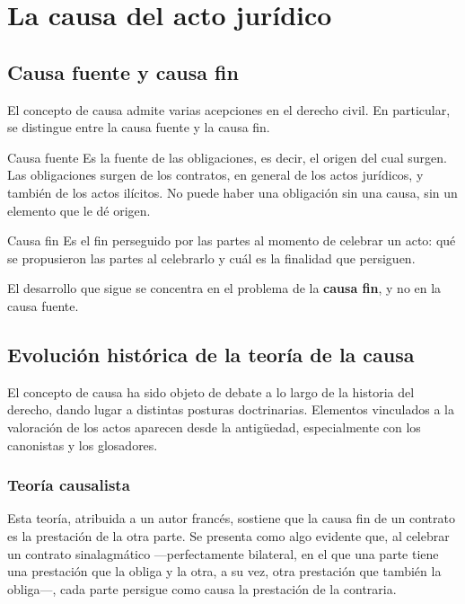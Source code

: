 \documentclass[12pt,oneside]{book}
\begin{document}
\chapter{La causa del acto jurídico}

\section{Causa fuente y causa fin}

El concepto de causa admite varias acepciones en el derecho civil. En particular, se distingue entre la causa fuente y la causa fin.

\begin{definition}{Causa fuente}
Es la fuente de las obligaciones, es decir, el origen del cual surgen. Las obligaciones surgen de los contratos, en general de los actos jurídicos, y también de los actos ilícitos. No puede haber una obligación sin una causa, sin un elemento que le dé origen.
\end{definition}

\begin{definition}{Causa fin}
Es el fin perseguido por las partes al momento de celebrar un acto: qué se propusieron las partes al celebrarlo y cuál es la finalidad que persiguen.
\end{definition}

El desarrollo que sigue se concentra en el problema de la \textbf{causa fin}, y no en la causa fuente.

\section{Evolución histórica de la teoría de la causa}

El concepto de causa ha sido objeto de debate a lo largo de la historia del derecho, dando lugar a distintas posturas doctrinarias. Elementos vinculados a la valoración de los actos aparecen desde la antigüedad, especialmente con los canonistas y los glosadores.

\subsection{Teoría causalista}

Esta teoría, atribuida a un autor francés, sostiene que la causa fin de un contrato es la prestación de la otra parte. Se presenta como algo evidente que, al celebrar un contrato sinalagmático —perfectamente bilateral, en el que una parte tiene una prestación que la obliga y la otra, a su vez, otra prestación que también la obliga—, cada parte persigue como causa la prestación de la contraria.
\end{document}
